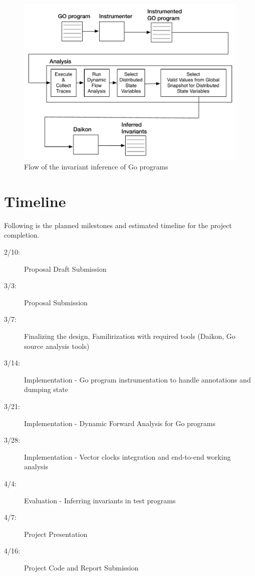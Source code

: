 \begin{figure}
  \includegraphics[width=\columnwidth]{go_flow.pdf}
  \caption{Flow of the invariant inference of Go programs}
  \label{fig:go_flow}
\end{figure}

\section{Timeline}

Following is the planned milestones and estimated timeline for the project completion.

\begin{description}
  \item[2/10:] Proposal Draft Submission
  \item[3/3:] Proposal Submission
  \item[3/7:] Finalizing the design, Familirization with required tools (Daikon, Go source analysis tools)
  \item[3/14:] Implementation - Go program instrumentation to handle annotations and dumping state
  \item[3/21:] Implementation - Dynamic Forward Analysis for Go programs
  \item[3/28:] Implementation - Vector clocks integration and end-to-end working analysis
  \item[4/4:] Evaluation - Inferring invariants in test programs
  \item[4/7:] Project Presentation
  \item[4/16:] Project Code and Report Submission
\end{description}